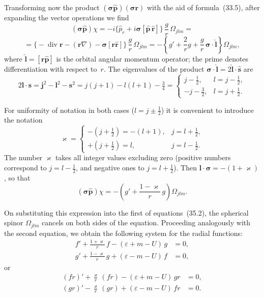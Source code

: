Transforming now the product $(\boldsymbol{\sigma}\widehat{\mathbf{p}})(\boldsymbol{\sigma}\mathbf{r})$ with the aid of formula~(33.5), after expanding the vector operations we find
\[
(\boldsymbol{\sigma}\widehat{\mathbf{p}})\chi = -i\{\widehat p_r + i\boldsymbol{\sigma}[\widehat{\mathbf{p}}\,\widehat{\mathbf{r}}]\}\,\frac{g}{r}\,\Omega_{jlm} =
\]
\[
= \bigl\{-\mathop{\mathrm{div}}\mathbf{r} - (\mathbf{r}\nabla) - \boldsymbol{\sigma}[\mathbf{r}\widehat{\mathbf{r}}]\bigr\}\,\frac{g}{r}\,\Omega_{jlm}
= -\!\left\{g' + \frac{2}{r}g + \frac{g}{r}\,\boldsymbol{\sigma}\cdot\widehat{\mathbf{l}}\right\}\!\Omega_{jlm},
\]
where $\widehat{\mathbf{l}} = [\mathbf{r}\widehat{\mathbf{p}}]$ is the orbital angular momentum operator; the prime denotes differentiation with respect to~$r$. The eigenvalues of the product $\boldsymbol{\sigma}\cdot\widehat{\mathbf{l}} = 2\widehat{\mathbf{l}}\cdot\widehat{\mathbf{s}}$ are
\[
2\mathbf{l}\cdot\mathbf{s} = \mathbf{j}^2 - \mathbf{l}^2 - \mathbf{s}^2 = j(j+1) - l(l+1) - \tfrac{3}{4} =
\begin{cases}
j - \tfrac{1}{2}, & l = j - \tfrac{1}{2},\\
-j - \tfrac{3}{2}, & l = j + \tfrac{1}{2}.
\end{cases}
\]

For uniformity of notation in both cases ($l = j \pm \tfrac{1}{2}$) it is convenient to introduce the notation
\begin{equation}
\varkappa =
\begin{cases}
-(j + \tfrac{1}{2}) = -(l+1), & j = l + \tfrac{1}{2},\\
+(j + \tfrac{1}{2}) = l, & j = l - \tfrac{1}{2}.
\end{cases}
\tag{35.3}
\end{equation}
The number $\varkappa$ takes all integer values excluding zero (positive numbers correspond to $j = l - \tfrac{1}{2}$, and negative ones to $j = l + \tfrac{1}{2}$). Then $\mathbf{l}\cdot\boldsymbol{\sigma} = -(1 + \varkappa)$, so that
\[
(\boldsymbol{\sigma}\widehat{\mathbf{p}})\chi = -\!\left(g' + \frac{1-\varkappa}{r}\,g\right)\!\Omega_{jlm}.
\]

On substituting this expression into the first of equations~(35.2), the spherical spinor $\Omega_{jlm}$ cancels on both sides of the equation. Proceeding analogously with the second equation, we obtain the following system for the radial functions:
\begin{equation}
\begin{aligned}
f' + \frac{1+\varkappa}{r}\,f - (\varepsilon + m - U)\,g &= 0,\\[4pt]
g' + \frac{1-\varkappa}{r}\,g + (\varepsilon - m - U)\,f &= 0,
\end{aligned}
\tag{35.4}
\end{equation}
or
\begin{equation}
\begin{aligned}
(fr)' + \frac{\varkappa}{r}\,(fr) - (\varepsilon + m - U)\,gr &= 0,\\[4pt]
(gr)' - \frac{\varkappa}{r}\,(gr) + (\varepsilon - m - U)\,fr &= 0.
\end{aligned}
\tag{35.5}
\end{equation}

